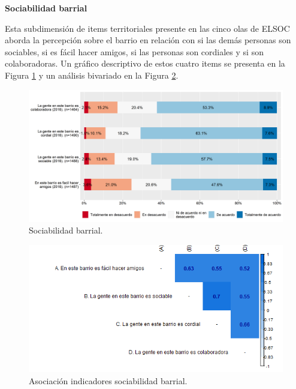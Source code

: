 \documentclass[
  12pt,
]{book}
\begin{document}
\textbf{Sociabilidad barrial}

Esta subdimensión de items territoriales presente en las cinco olas de ELSOC aborda la percepción sobre el barrio en relación con si las demás personas son sociables, si es fácil hacer amigos, si las personas son cordiales y si son colaboradoras. Un gráfico descriptivo de estos cuatro items se presenta en la Figura \ref{fig:sociabilidad-barrial} y un análisis bivariado en la Figura \ref{fig:sociabilidad-barrial-cor}.

\begin{figure}[H]

{\centering \includegraphics[width=1\linewidth,height=1\textheight]{output/graphs/sociabilidad-barrial} 

}

\caption{Sociabilidad barrial.}\label{fig:sociabilidad-barrial}
\end{figure}

\begin{figure}[H]

{\centering \includegraphics[width=1\linewidth,height=1\textheight]{output/graphs/sociabilidad-barrial_cor} 

}

\caption{Asociación indicadores sociabilidad barrial.}\label{fig:sociabilidad-barrial-cor}
\end{figure}
\end{document}
